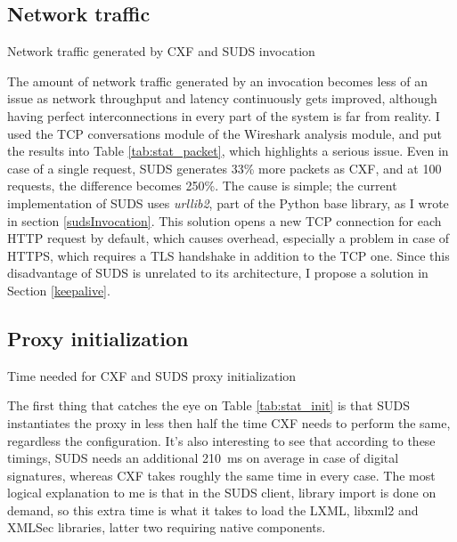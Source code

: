 \subsection{Network traffic}
\label{traffic}

\begin{table}[htbp]
 \begin{center}
  
  \caption{Network traffic generated by CXF and SUDS invocation}
  \label{tab:stat_packet}
 \end{center}
\end{table}

\noindent
The amount of network traffic generated by an invocation becomes less of an issue as network throughput and latency continuously gets improved, although having perfect interconnections in every part of the system is far from reality. I used the TCP conversations module of the Wireshark analysis module, and put the results into Table \ref{tab:stat_packet}, which highlights a serious issue. Even in case of a single request, SUDS generates 33\% more packets as CXF, and at 100 requests, the difference becomes 250\%. The cause is simple; the current implementation of SUDS uses \emph{urllib2}, part of the Python base library, as I wrote in section \ref{sudsInvocation}. This solution opens a new TCP connection for each HTTP request by default, which causes overhead, especially a problem in case of HTTPS, which requires a TLS handshake in addition to the TCP one. Since this disadvantage of SUDS is unrelated to its architecture, I propose a solution in Section \ref{keepalive}.

\subsection{Proxy initialization}

\begin{table}[htbp]
 \begin{center}
  
  \caption{Time needed for CXF and SUDS proxy initialization}
  \label{tab:stat_init}
 \end{center}
\end{table}

\noindent
The first thing that catches the eye on Table \ref{tab:stat_init} is that SUDS instantiates the proxy in less then half the time CXF needs to perform the same, regardless the configuration. It's also interesting to see that according to these timings, SUDS needs an additional \mbox{210 ms} on average in case of digital signatures, whereas CXF takes roughly the same time in every case. The most logical explanation to me is that in the SUDS client, library import is done on demand, so this extra time is what it takes to load the LXML, libxml2 and XMLSec libraries, latter two requiring native components.

